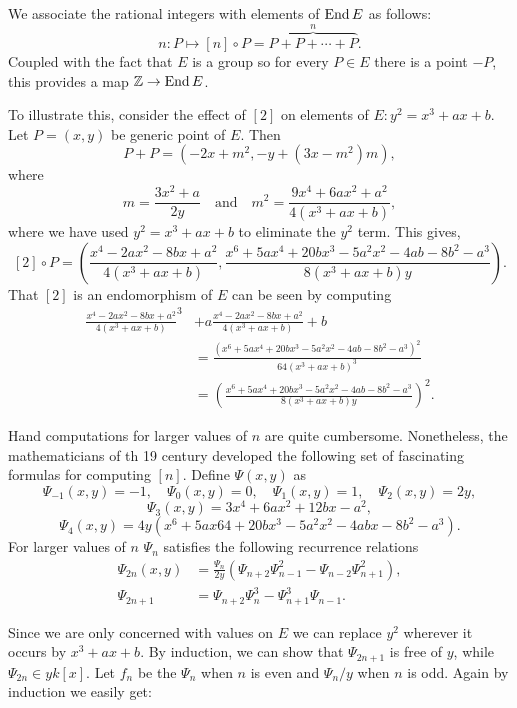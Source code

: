 We associate the rational integers with elements of $\mathop{\rm End}\nolimits E$ as follows:
\[
n : P \mapsto [n]\circ P = \overbrace{P + P + \cdots + P}^{n}.
\]
Coupled with the fact that $E$ is a group so for every $P \in E$ there
is a point $-P$, this provides a map $\mathbb{Z} \rightarrow \mathop{\rm End}\nolimits E$.

To illustrate this, consider the effect of $[2]$ on elements of $E: y^2 =
x^3 + ax +b$.  Let $P = (x, y)$ be generic point of $E$.  Then
\[
P+ P = ( -2x +m^2, -y + (3x -m^2) m),
\]
where 
\[
m = \frac{3x^2+a}{2y} \quad\mbox{and}\quad
m^2 = \frac{9x^4+6ax^2 +a^2}{4(x^3 +ax+b)},
\]
where we have used $y^2 = x^3+ax+b$ to eliminate the $y^2$ term.
This gives,
\begin{equation}\label{El:Double:Eq}
[2]\circ P = \left( \frac{x^4-2ax^2-8bx+a^2}{4(x^3+ax+b)}, 
   \frac{x^6+5ax^4+20bx^3-5a^2x^2-4ab-8b^2-a^3}{8(x^3+ax+b)y}\right).
\end{equation}
That $[2]$ is an endomorphism of $E$ can be seen by computing
\[
\begin{aligned}
\frac{x^4-2ax^2-8bx+a^2}{4(x^3+ax+b)}^3 &+ a
\frac{x^4-2ax^2-8bx+a^2}{4(x^3+ax+b)} +b \\
&= \frac{(x^6+5ax^4+20bx^3-5a^2x^2-4ab-8b^2-a^3)^2}{64(x^3+ax+b)^3} \\
&=
\left(\frac{x^6+5ax^4+20bx^3-5a^2x^2-4ab-8b^2-a^3}{8(x^3+ax+b)y}\right)^2.
\end{aligned}
\]

Hand computations for larger values of $n$ are quite cumbersome.
Nonetheless, the mathematicians of th 19\th{} century developed the
following set of fascinating formulas for computing $[n]$.  Define
$\Psi(x,y)$ as 
\[
\Psi_{-1}(x,y) = -1, \quad \Psi_{0}(x,y) = 0, \quad
\Psi_{1}(x,y) = 1, \quad
\Psi_{2}(x,y) = 2y,
\]
\[
\Psi_3(x,y) = 3 x^4 + 6a x^2 + 12 b x - a^2,
\]
\[
\Psi_4(x,y) = 4y(x^6 + 5a x64 + 20bx^3 - 5a^2 x^2 - 4abx -8b^2-a^3).
\]
For larger values of $n$ $\Psi_n$ satisfies the following recurrence
relations 
\[
\begin{aligned}
\Psi_{2n}(x,y) &= \displaystyle {\frac{\Psi_n}{2 y}}
\left(\Psi_{n+2} \Psi_{n-1}^2 - \Psi_{n-2} \Psi_{n+1}^2\right),\\
\Psi_{2n+1} &= \Psi_{n+2} \Psi_n^3 - \Psi_{n+1}^3 \Psi_{n-1}.
\end{aligned}
\]

Since we are only concerned with values on $E$ we can replace $y^2$
wherever it occurs by $x^3 +ax+b$.  By induction, we can show that 
$\Psi_{2n+1}$ is free of $y$, while $\Psi_{2n} \in y k[x]$.  Let
$f_n$ be the $\Psi_n$ when $n$ is even and $\Psi_n/y$ when $n$ is odd.
Again by induction we easily get:

